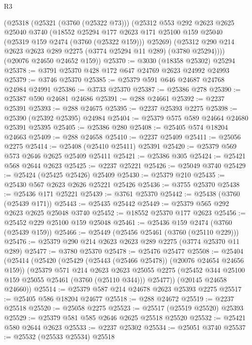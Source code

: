 \begin{lexlean}{R3}
\begin{coremodule}
      (@25318
        (@25321 (@3760 (@25322 @73)))
        (@25312
          @553
          @292
          @2623
          @2625
          @25040
          @3740
          (@18552
            @25294
            @177
            @2623
            @171
            @25100
            @159
            @25040
            (@25319 @159 @2474 (@3760 (@25322 @159)))
            @25269)
          (@25312 @290 @214 @2623 @2623 @289 @2275 (@3774 @25294 @11 @289) (@3780 @25294))))
      (@20076 @24650 @24652 @159))
@25370 := @3030 (@18358 @25302) @25294
@25378 := @3791 @25370 @428 @172 @647 @24769 @2623 @24992 @24993
@25379 := @3746 @25370
@25385 := @25379 @591 @646 @24687 @24768 @24984 @24991
@25386 := @3733 @25370
@25387 := @25386 @278
@25390 := @25387 @590 @24681 @24686
@25391 := @288 @24661
@25392 := @2237 @25391
@25393 := @288 @24675
@25395 := @2237 @25393 @2275
@25398 := @25390 (@25392 @25395) @24984
@25404 := @25379 @575 @589 @24664 @24680 @25391 @25395
@25405 := @25386 @280
@25408 := @25405 @574 @18204 @24663
@25409 := @288 @24658
@25410 := @2237 @25409
@25411 := @25056 @2275
@25414 := @25408 (@25410 @25411) @25391
@25420 := @25379 @569 @573 @2646 @2625 @25409 @25411
@25421 := @25386 @305
@25424 := @25421 @568 @2644 @2623
@25425 := @2237 @25221
@25426 := @25049 @3740
@25429 := @25424 (@25425 @25426) @25409
@25430 := @25379 @210
@25435 := @25430 @567 @2623 @2626 @25221 @25426
@25436 := @3755 @25370
@25438 := @25436 @171 @25221
@25439 := @3761 @25370
@25442 := @25438 (@3760 (@25439 @171))
@25443 := @25435 @25442
@25449 := @25379 @565 @292 @2623 @2625 @25048 @3740
@25452 := @18552 @25370 @177 @2623
@25456 := @25452 @229 @25100 @159 @25048
@25461 := @25436 @159 @2474 (@3760 (@25439 @159))
@25466 := @25449 (@25456 @25461 (@3760 (@25110 @229)))
@25476 := @25379 @290 @214 @2623 @2623 @289 @2275 (@3774 @25370 @11 @289)
@25477 := @3780 @25370
@25478 := @25476 @25477
@25508 := @25404
    (@25414
      (@25420
        (@25429 (@25443 (@25466 @25478)) (@20076 @24654 @24656 @159))
        (@25379
          @571
          @214
          @2623
          @2623
          @25055
          @2275
          (@25452 @344 @25100 @159 @25055 @25461 (@3760 (@25110 @344)))
          @25477))
      (@20145 @24658 @24660))
@25514 := @25379 @587 @214 @24678 @2623 @25393 @2275
@25517 := @25405 @586 @18204 @24677
@25518 := @288 @24672
@25519 := @2237 @25518
@25520 := @25058 @2275
@25523 := @25517 (@25519 @25520) @25393
@25529 := @25379 @581 @585 @2646 @2625 @25518 @25520
@25532 := @25421 @580 @2644 @2623
@25533 := @2237 @25302
@25534 := @25051 @3740
@25537 := @25532 (@25533 @25534) @25518

\end{coremodule}
\end{lexlean}
